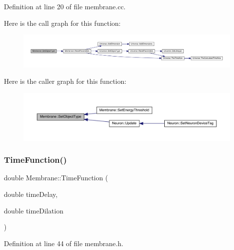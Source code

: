 Definition at line 20 of file membrane.\+cc.

Here is the call graph for this function\+:
\nopagebreak
\begin{figure}[H]
\begin{center}
\leavevmode
\includegraphics[width=350pt]{class_membrane_a5ba2bcb906f3984b28f1030207e106ad_cgraph}
\end{center}
\end{figure}
Here is the caller graph for this function\+:
\nopagebreak
\begin{figure}[H]
\begin{center}
\leavevmode
\includegraphics[width=350pt]{class_membrane_a5ba2bcb906f3984b28f1030207e106ad_icgraph}
\end{center}
\end{figure}
\mbox{\label{class_membrane_a8c3593b0747495c412bf2d99b7b10104}} 
\subsubsection{\texorpdfstring{Time\+Function()}{TimeFunction()}}
{\footnotesize\ttfamily double Membrane\+::\+Time\+Function (\begin{DoxyParamCaption}\item[{double}]{time\+Delay,  }\item[{double}]{time\+Dilation }\end{DoxyParamCaption})\hspace{0.3cm}{\ttfamily [inline]}}



Definition at line 44 of file membrane.\+h.

\mbox{\label{class_membrane_a4af9710ea7f0bc6f1b6b6b6462612d51}} 
